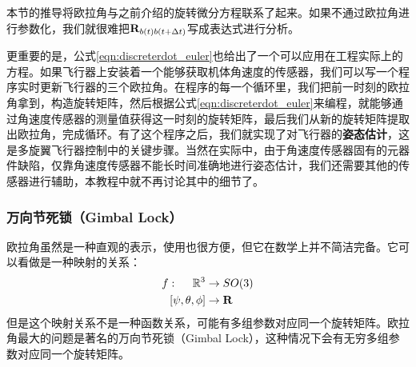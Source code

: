 \documentclass[11pt]{article}
\begin{document}
本节的推导将欧拉角与之前介绍的旋转微分方程联系了起来。如果不通过欧拉角进行参数化，我们就很难把${\bf R}_{b(t)b(t+\Delta t)}$写成表达式进行分析。

更重要的是，公式\ref{eqn:discreterdot_euler}也给出了一个可以应用在工程实际上的方程。如果飞行器上安装着一个能够获取机体角速度的传感器，我们可以写一个程序实时更新飞行器的三个欧拉角。在程序的每一个循环里，我们把前一时刻的欧拉角拿到，构造旋转矩阵，然后根据公式\ref{eqn:discreterdot_euler}来编程，就能够通过角速度传感器的测量值获得这一时刻的旋转矩阵，最后我们从新的旋转矩阵提取出欧拉角，完成循环。有了这个程序之后，我们就实现了对飞行器的\textbf{姿态估计}，这是多旋翼飞行器控制中的关键步骤。当然在实际中，由于角速度传感器固有的元器件缺陷，仅靠角速度传感器不能长时间准确地进行姿态估计，我们还需要其他的传感器进行辅助，本教程中就不再讨论其中的细节了。
\subsubsection{万向节死锁（Gimbal Lock）}
欧拉角虽然是一种直观的表示，使用也很方便，但它在数学上并不简洁完备。它可以看做是一种映射的关系：
\begin{align*}
 f: \ \ \ \ \mathbb{R}^3 & \rightarrow SO(3) \\
	[\psi, \theta, \phi] & \rightarrow {\bf R}	
\end{align*}
但是这个映射关系不是一种函数关系，可能有多组参数对应同一个旋转矩阵。欧拉角最大的问题是著名的万向节死锁（Gimbal Lock），这种情况下会有无穷多组参数对应同一个旋转矩阵。
\end{document}
